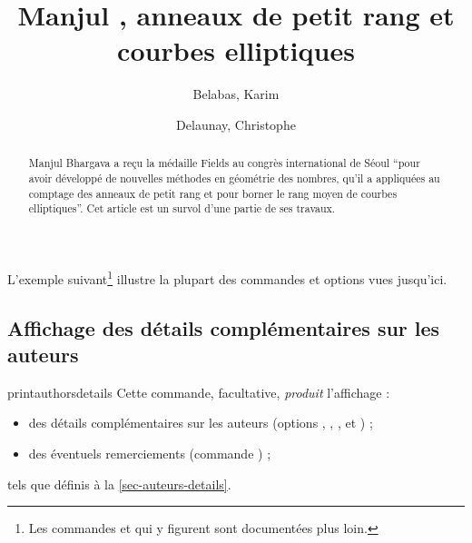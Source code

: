 L'exemple suivant\footnote{Les commandes  et 
  qui y figurent sont documentées plus loin.} illustre la plupart des commandes
et options vues jusqu'ici.

\begin{bodycode}
\title[short=Les travaux de Manjul \surname{Bhargava}]{Manjul ,
  anneaux de petit rang et courbes elliptiques}
%
\author[%
  affiliation={%
    Univ. Bordeaux, IMB, UMR 5251, F-33400 Talence, France\newline%
    CNRS, IMB, UMR 5251, F-33400 Talence, France\newline%
    INRIA, F-33400 Talence, France%
  },%
  photo=Belabas,%
  email=Karim.Belabas@math.u-bordeaux.fr,%
  minibio={%
    Karim Belabas est professeur à l'université de Bordeaux.  Ses centres
    d'intérêts sont la théorie des nombres sous toutes ses formes et le calcul
    formel.  Il développe le système libre PARI/GP.%
  }%
]{Belabas, Karim}
%
\author[%
  affiliation={%
    Laboratoire de Mathématiques de Besançon, Facultés des sciences et techniques,
    CNRS, UMR 6623, 16 route de Gray, 25030 Besançon, France%
  },%
  photo=Delaunay,%
  email=Christophe.Delaunay@univ-fcomte.fr,%
  minibio={%
    Christophe Delaunay est professeur à l'université de Franche-Comté et membre
    du laboratoire de mathématiques de Besançon. Il est spécialiste de théorie des
    nombres.%
  }%
]{Delaunay, Christophe}
%
\begin{abstract}
  Manjul Bhargava a reçu la médaille Fields au congrès international de Séoul
  \enquote{pour avoir développé de nouvelles méthodes en géométrie des nombres,
    qu'il a appliquées au comptage des anneaux de petit rang et pour borner le
    rang moyen de courbes elliptiques}. Cet article est un survol d'une partie
  de ses travaux.
\end{abstract}
%
\maketitle
\end{bodycode}

\subsection{Affichage des détails complémentaires sur les auteurs}

\begin{docCommand}{printauthorsdetails}{}
  Cette commande, facultative, \emph{produit} l'affichage :
  \begin{itemize}
  \item des détails complémentaires sur les auteurs (options
    , , ,  et
    ) ;
  \item des éventuels remerciements (commande ) ;
  \end{itemize}
  tels que définis à la \vref{sec-auteurs-details}.
\end{docCommand}

